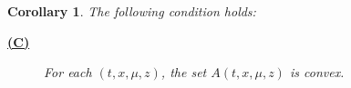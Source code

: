 \documentclass[11pt]{article}
\newtheorem{cor}[thm]{Corollary}
\newtheorem*{remark*}{Remark}
\theoremstyle{definition}
\begin{document}

\begin{cor}
The following condition holds:
\begin{description}
  \item[\textbf{\hyperref[sup: C]{(C)}}]
  \label{sup: C}
 For each \( (t,x,\mu,z) \), the set \( A(t,x,\mu,z) \) is convex.
\end{description}
\end{cor}
\end{document}
